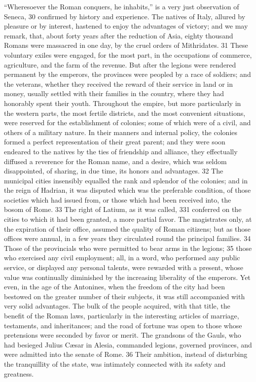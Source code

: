 “Wheresoever the Roman conquers, he inhabits,” is a very just
observation of Seneca, 30 confirmed by history and experience.
The natives of Italy, allured by pleasure or by interest,
hastened to enjoy the advantages of victory; and we may remark,
that, about forty years after the reduction of Asia, eighty
thousand Romans were massacred in one day, by the cruel orders of
Mithridates. 31 These voluntary exiles were engaged, for the most
part, in the occupations of commerce, agriculture, and the farm
of the revenue. But after the legions were rendered permanent by
the emperors, the provinces were peopled by a race of soldiers;
and the veterans, whether they received the reward of their
service in land or in money, usually settled with their families
in the country, where they had honorably spent their youth.
Throughout the empire, but more particularly in the western
parts, the most fertile districts, and the most convenient
situations, were reserved for the establishment of colonies; some
of which were of a civil, and others of a military nature. In
their manners and internal policy, the colonies formed a perfect
representation of their great parent; and they were soon endeared
to the natives by the ties of friendship and alliance, they
effectually diffused a reverence for the Roman name, and a
desire, which was seldom disappointed, of sharing, in due time,
its honors and advantages. 32 The municipal cities insensibly
equalled the rank and splendor of the colonies; and in the reign
of Hadrian, it was disputed which was the preferable condition,
of those societies which had issued from, or those which had been
received into, the bosom of Rome. 33 The right of Latium, as it
was called, 331 conferred on the cities to which it had been
granted, a more partial favor. The magistrates only, at the
expiration of their office, assumed the quality of Roman
citizens; but as those offices were annual, in a few years they
circulated round the principal families. 34 Those of the
provincials who were permitted to bear arms in the legions; 35
those who exercised any civil employment; all, in a word, who
performed any public service, or displayed any personal talents,
were rewarded with a present, whose value was continually
diminished by the increasing liberality of the emperors. Yet
even, in the age of the Antonines, when the freedom of the city
had been bestowed on the greater number of their subjects, it was
still accompanied with very solid advantages. The bulk of the
people acquired, with that title, the benefit of the Roman laws,
particularly in the interesting articles of marriage, testaments,
and inheritances; and the road of fortune was open to those whose
pretensions were seconded by favor or merit. The grandsons of the
Gauls, who had besieged Julius Cæsar in Alesia, commanded
legions, governed provinces, and were admitted into the senate of
Rome. 36 Their ambition, instead of disturbing the tranquillity
of the state, was intimately connected with its safety and
greatness.

